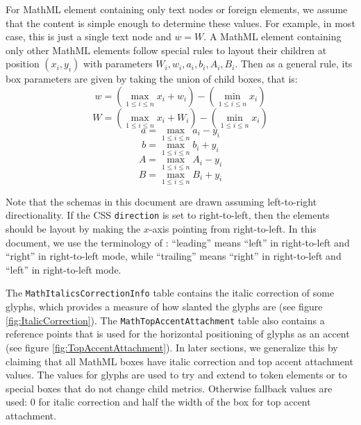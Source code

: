 For MathML element containing only text nodes or foreign elements, we assume
that the content is simple enough to determine these values. For example,
in most case, this is just a single text node and $w = W$.
A MathML element containing only other MathML elements follow special rules to
layout their children at position $(x_i,y_i)$ with parameters
$W_i,w_i,a_i,b_i,A_i,B_i$. Then as a general rule, its box parameters are given
by taking the union of child boxes, that is:
%
$$w = \left(\max_{1 \leq i \leq n } {x_i + w_i}\right) -
      \left(\min_{1 \leq i \leq n} x_i\right)$$
$$W = \left(\max_{1 \leq i \leq n } {x_i + W_i}\right) -
      \left(\min_{1 \leq i \leq n} x_i\right)$$
$$a = \max_{1 \leq i \leq n } {a_i - y_i}$$
$$b = \max_{1 \leq i \leq n } {b_i + y_i}$$
$$A = \max_{1 \leq i \leq n } {A_i - y_i}$$
$$B = \max_{1 \leq i \leq n } {B_i + y_i}$$
%

Note that the schemas in this document are drawn assuming left-to-right
directionality. If the CSS {\tt direction} is set to right-to-left, then the
elements should be layout by making the $x$-axis pointing from right-to-left.
In this document, we use the terminology of \cite{MathML3}: ``leading''
means ``left'' in right-to-left and ``right'' in right-to-left mode, while
``trailing'' means ``right'' in right-to-left and ``left'' in right-to-left
mode.

The {\tt MathItalicsCorrectionInfo} table contains the italic
correction of some glyphs, which provides a measure of how slanted the
glyphs are (see figure \ref{fig:ItalicCorrection}). The
{\tt MathTopAccentAttachment} table also contains a reference
points that is used for the horizontal positioning of glyphs as an accent
(see figure \ref{fig:TopAccentAttachment}). In later sections, we
generalize this by claiming that all MathML boxes have italic correction
and top accent attachment values. The values for glyphs are used to try and
extend to token elements or to special boxes that do not change child metrics.
Otherwise fallback values are used: 0 for italic correction and half
the width of the box for top accent attachment.


